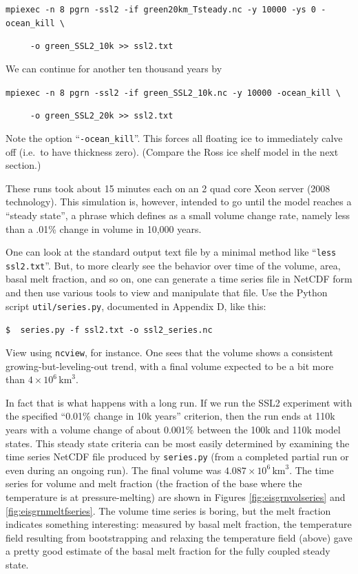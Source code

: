 \documentclass[11pt,final]{amsart}
\begin{document}
\verb|mpiexec -n 8 pgrn -ssl2 -if green20km_Tsteady.nc -y 10000 -ys 0 -ocean_kill \|

\verb|     -o green_SSL2_10k >> ssl2.txt|

\noindent We can continue for another ten thousand years by

\verb|mpiexec -n 8 pgrn -ssl2 -if green_SSL2_10k.nc -y 10000 -ocean_kill \|

\verb|     -o green_SSL2_20k >> ssl2.txt|

Note the option ``\verb|-ocean_kill|''.  This forces all floating ice to immediately calve off (i.e.~to have thickness zero).  (Compare the Ross ice shelf model in the next section.)

These runs took about 15 minutes each on an 2 quad core Xeon server (2008 technology).  This simulation is, however, intended to go until the model reaches a ``steady state'', a phrase which \cite{RitzEISMINT} defines as a small volume change rate, namely less than a .01\% change in volume in 10,000 years.

One can look at the standard output text file by a minimal method like ``\verb|less ssl2.txt|''.  But, to more clearly see the behavior over time of the volume, area, basal melt fraction, and so on, one can generate a time series file in NetCDF form and then use various tools to view and manipulate that file.  Use the Python script \verb|util/series.py|, documented in Appendix D, like this:

\verb|$  series.py -f ssl2.txt -o ssl2_series.nc|

\noindent View using \verb|ncview|, for instance.  One sees that the volume shows a consistent growing-but-leveling-out trend, with a final volume expected to be a bit more than $4 \times 10^{6}\,\text{km}^3$.

In fact that is what happens with a long run.  If we run the SSL2 experiment with the specified ``0.01\% change in 10k years'' criterion, then the run ends at 110k years with a volume change of about 0.001\% between the 100k and 110k model states.  This steady state criteria can be most easily determined by examining the time series NetCDF file produced by \verb|series.py| (from a completed partial run or even during an ongoing run).  The final volume was $4.087 \times 10^{6}\,\text{km}^3$.  The time series for volume and melt fraction (the fraction of the base where the temperature is at pressure-melting) are shown in Figures \ref{fig:eisgrnvolseries} and \ref{fig:eisgrnmeltfseries}.  The volume time series is boring, but the melt fraction indicates something interesting: measured by basal melt fraction, the temperature field resulting from bootstrapping and relaxing the temperature field (above) gave a pretty good estimate of the basal melt fraction for the fully coupled steady state.
\end{document}
